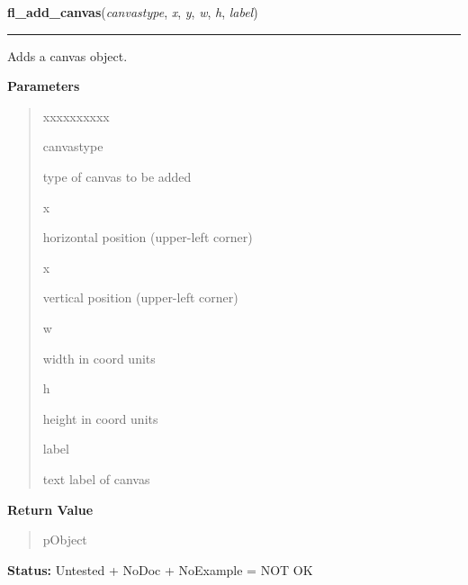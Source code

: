     \label{xformslib:library:fl_add_canvas}

    \vspace{0.5ex}

\hspace{.8\funcindent}\begin{boxedminipage}{\funcwidth}

    \raggedright \textbf{fl\_add\_canvas}(\textit{canvastype}, \textit{x}, \textit{y}, \textit{w}, \textit{h}, \textit{label})

    \vspace{-1.5ex}

    \rule{\textwidth}{0.5\fboxrule}
\setlength{\parskip}{2ex}
    Adds a canvas object.

\setlength{\parskip}{1ex}
      \textbf{Parameters}
      \vspace{-1ex}

      \begin{quote}
        \begin{Ventry}{xxxxxxxxxx}

          \item[canvastype]

          type of canvas to be added

          \item[x]

          horizontal position (upper-left corner)

          \item[x]

          vertical position (upper-left corner)

          \item[w]

          width in coord units

          \item[h]

          height in coord units

          \item[label]

          text label of canvas

        \end{Ventry}

      \end{quote}

      \textbf{Return Value}
    \vspace{-1ex}

      \begin{quote}
      pObject

      \end{quote}

\textbf{Status:} Untested + NoDoc + NoExample = NOT OK



    \end{boxedminipage}

